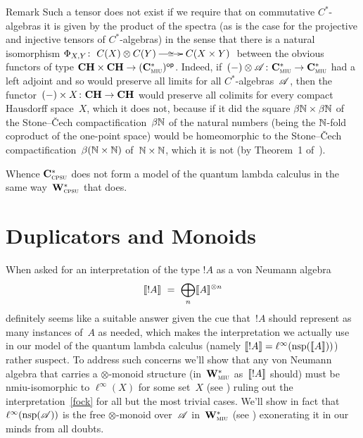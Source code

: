 \documentclass[a]{subfiles}
\begin{document}
\begin{parsec}
\begin{point}{Remark}
Such a tensor does not exist
if we require that
on commutative
$C^*$-algebras it is given by the product of the spectra
(as is the case for the projective and injective tensors
of $C^*$-algebras)
in the sense that there
is a natural isomorphism
$\Phi_{X,Y}\colon 
\smash{\xymatrix{
C(X)\otimes C(Y)
\ar[r]|-{\cong}
&
C(X\times  Y)}}$ 
between the obvious functors of type $\mathbf{CH}\times \mathbf{CH}\to {(\mathbf{C}^*_{\text{\textsc{miu}}})}{^{\mathsf{op}}}$.
Indeed, if~$(-)\otimes \mathscr{A}\colon \mathbf{C}^*_{\text{\textsc{miu}}}\to\mathbf{C}^*_{\text{\textsc{miu}}}$
had a left adjoint 
and so would preserve all limits
for all $C^*$-algebras~$\mathscr{A}$,
then the functor~$(-)\times X\colon \mathbf{CH}\to\mathbf{CH}$
would preserve all colimits
for every compact Hausdorff space~$X$,
which it does not,
because if it did
the square $\beta\mathbb{N} \times \beta\mathbb{N}$ of
the Stone--\v{C}ech compactification~$\beta\mathbb{N}$
of the natural numbers (being the $\mathbb{N}$-fold
coproduct of the one-point space)
would be homeomorphic to the Stone--\v{C}ech
compactification~$\beta(\mathbb{N}\times \mathbb{N})$
of~$\mathbb{N}\times \mathbb{N}$,
which it is not (by Theorem~1 of~\cite{glicksberg1959}).

Whence
$\mathbf{C}^*_{\text{\textsc{cpsu}}}$
does not form a model of the quantum lambda calculus
in the same way~$\mathbf{W}^*_{\text{\textsc{cpsu}}}$ that does.
\end{point}
\end{parsec}

\section{Duplicators and Monoids}
\label{S:duplicable}
\begin{parsec}%
\begin{point}%
When asked for an
interpretation of the type $!A$
as a von Neumann algebra
\begin{equation}
\label{fock}
\sem{!A}
\ = \ 
\bigoplus_n \sem{A}^{\otimes n}
\end{equation}
definitely seems
like a suitable answer
given
the cue that~$!A$ should represent
as many instances of~$A$ as needed,
which makes the interpretation
we actually use in our model of the quantum lambda calculus
(namely $\llbracket!A\rrbracket=\ell^\infty(\mathrm{nsp}(\llbracket A\rrbracket))$)
rather
suspect.
To address such concerns
we'll show that any von Neumann algebra
that carries a $\otimes$-monoid structure
(in~$\mathbf{W}^*_{\text{\textsc{miu}}}$ as~$\llbracket!A\rrbracket$ should)
must be nmiu-isomorphic
to $\ell^\infty(X)$ for some set~$X$
(see )
ruling out the interpretation~\eqref{fock}
for all but the most trivial cases.
We'll show in fact that~$\ell^\infty(\mathrm{nsp}(\mathscr{A}))$
is the free $\otimes$-monoid
over~$\mathscr{A}$
in~$\mathbf{W}^*_{\text{\textsc{miu}}}$ (see )
exonerating it in our minds from all doubts.
\end{point}
\end{parsec}
\end{document}
